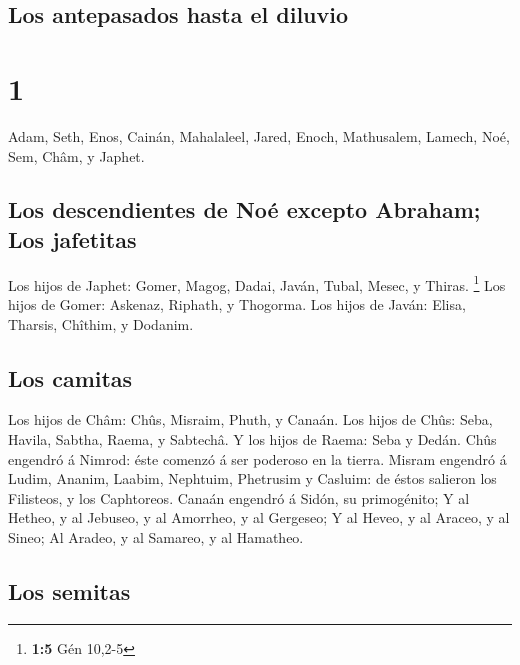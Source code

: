 \hypertarget{los-antepasados-hasta-el-diluvio}{%
\subsection{Los antepasados \hspace{0pt}\hspace{0pt}hasta el
diluvio}\label{los-antepasados-hasta-el-diluvio}}

\hypertarget{section}{%
\section{1}\label{section}}

 Adam, Seth, Enos,  Cainán, Mahalaleel, Jared,
 Enoch, Mathusalem, Lamech,  Noé, Sem, Châm, y
Japhet.

\hypertarget{los-descendientes-de-nouxe9-excepto-abraham-los-jafetitas}{%
\subsection{Los descendientes de Noé excepto Abraham; Los
jafetitas}\label{los-descendientes-de-nouxe9-excepto-abraham-los-jafetitas}}

 Los hijos de Japhet: Gomer, Magog, Dadai, Javán, Tubal,
Mesec, y Thiras. \footnote{\textbf{1:5} Gén 10,2-5}  Los
hijos de Gomer: Askenaz, Riphath, y Thogorma.  Los hijos de
Javán: Elisa, Tharsis, Chîthim, y Dodanim.

\hypertarget{los-camitas}{%
\subsection{Los camitas}\label{los-camitas}}

 Los hijos de Châm: Chûs, Misraim, Phuth, y Canaán.
 Los hijos de Chûs: Seba, Havila, Sabtha, Raema, y Sabtechâ.
Y los hijos de Raema: Seba y Dedán.  Chûs engendró á
Nimrod: éste comenzó á ser poderoso en la tierra.  Misram
engendró á Ludim, Ananim, Laabim, Nephtuim,  Phetrusim y
Casluim: de éstos salieron los Filisteos, y los Caphtoreos.
 Canaán engendró á Sidón, su primogénito;  Y
al Hetheo, y al Jebuseo, y al Amorrheo, y al Gergeseo;  Y
al Heveo, y al Araceo, y al Sineo;  Al Aradeo, y al
Samareo, y al Hamatheo.

\hypertarget{los-semitas}{%
\subsection{Los semitas}\label{los-semitas}}

